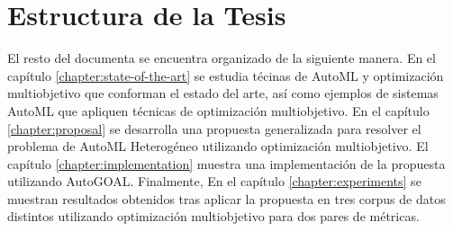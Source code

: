 \section*{Estructura de la Tesis}
El resto del documenta se encuentra organizado de la siguiente manera. En el cap\'itulo \ref{chapter:state-of-the-art} se estudia t\'ecinas de AutoML y optimizaci\'on multiobjetivo que conforman el estado del arte, as\'i como ejemplos de sistemas AutoML que apliquen t\'ecnicas de optimizaci\'on multiobjetivo. En el cap\'itulo \ref{chapter:proposal} se desarrolla una propuesta generalizada para resolver el problema de AutoML Heterog\'eneo utilizando optimizaci\'on multiobjetivo. El cap\'itulo \ref{chapter:implementation} muestra una implementaci\'on de la propuesta utilizando AutoGOAL. Finalmente, En el cap\'itulo \ref{chapter:experiments} se muestran resultados obtenidos tras aplicar la propuesta en tres corpus de datos distintos utilizando optimizaci\'on multiobjetivo para dos pares de m\'etricas. 
